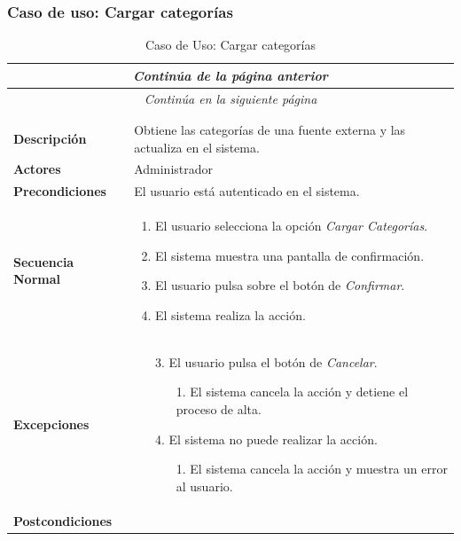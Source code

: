 \subsubsection*{Caso de uso: Cargar categorías }
\begin{longtable}{| p{4cm} | p{10cm} |}
\endfirsthead
\multicolumn{2}{c}{\textit{Continúa de la página anterior}}\\[12pt]
\hline
\endhead
\hline
\multicolumn{2}{c}{\textit{Continúa en la siguiente página}} \\
\endfoot
\hline
\caption{Caso de Uso: Cargar categorías}\label{fig:1}\\
\endlastfoot


\hline
\multicolumn{2}{|c|}{\textbf{CU$<$42$>$ - Cargar Categorías}} \\

\hline
\textbf{Descripción} &
Obtiene las categorías de una fuente externa y las actualiza en el sistema.\\

\hline
\textbf{Actores} &
Administrador\\

\hline
\textbf{Precondiciones} &
El usuario está autenticado en el sistema.\\

\hline
\textbf{Secuencia Normal} &\mbox{}\par\vspace{-\baselineskip}
\begin{enumerate}[leftmargin=0.7cm, topsep=0.1cm]
\item El usuario selecciona la opción \textit{Cargar Categorías}.
\item El sistema muestra una pantalla de confirmación.
\item El usuario pulsa sobre el botón de \textit{Confirmar}.
\item El sistema realiza la acción.
\end{enumerate}


\\
\hline
\textbf{Excepciones} &\mbox{}\par\vspace{-\baselineskip}
\begin{enumerate}[leftmargin=0.9cm, topsep=0.1cm]
\item[3.] El usuario pulsa el botón de \textit{Cancelar}.
	\begin{itemize}
	\item[1.] El sistema cancela la acción y detiene el proceso de alta.
	\end{itemize}
\item[4.] El sistema no puede realizar la acción.
	\begin{itemize}
	\item[1.] El sistema cancela la acción y muestra un error al usuario.
	\end{itemize}
\end{enumerate}
\\

\hline
\textbf{Postcondiciones} & \\
\hline
\end{longtable}



